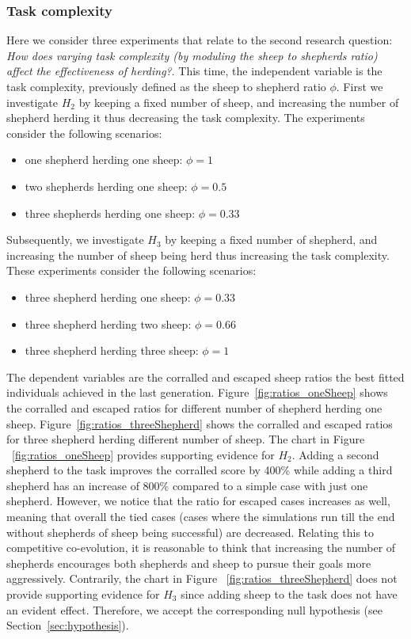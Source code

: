 \documentclass[conference]{IEEEtran}
\begin{document}
\subsubsection{Task complexity}
Here we consider three experiments that relate to the second research question: \textit{How does varying task complexity (by moduling the sheep to shepherds ratio) affect the effectiveness of herding?}. 
This time, the independent variable is the task complexity, previously defined as the sheep to shepherd ratio $\phi$.
 First we investigate $H_2$ by keeping a fixed number of sheep, and increasing the number of shepherd herding it thus decreasing the task complexity. 
 The experiments consider the following scenarios:
\begin{itemize}
	\item one shepherd herding one sheep: $\phi = 1$
	\item two shepherds herding one sheep: $\phi = 0.5$
	\item three shepherds herding one sheep: $\phi = 0.33$
\end{itemize}	
Subsequently, we investigate $H_3$ by keeping a fixed number of shepherd, and increasing the number of sheep being herd thus increasing the task complexity. These experiments consider the following scenarios:
\begin{itemize}
	\item three shepherd herding one sheep: $\phi = 0.33$
	\item three shepherd herding two sheep: $\phi = 0.66$
	\item three shepherd herding three sheep: $\phi = 1$
\end{itemize}
The dependent variables are the corralled and escaped sheep ratios the best fitted individuals achieved in the last generation.
Figure~\ref{fig:ratios_oneSheep} shows the corralled and escaped ratios for different number of shepherd herding one sheep. Figure~\ref{fig:ratios_threeShepherd} shows the corralled and escaped ratios for three shepherd herding different number of sheep. 
The chart in Figure ~\ref{fig:ratios_oneSheep} provides supporting evidence for $H_2$. Adding a second shepherd to the task improves the corralled score by 400\% while adding a third shepherd has an increase of 800\% compared to a simple case with just one shepherd. 
However, we notice that the ratio for escaped cases increases as well, meaning that overall the tied cases (cases where the simulations run till the end without shepherds of sheep being successful) are decreased. 
Relating this to competitive co-evolution, it is reasonable to think that increasing the number of shepherds encourages both shepherds and sheep to pursue their goals more aggressively.
Contrarily, the chart in Figure ~\ref{fig:ratios_threeShepherd} does not provide supporting evidence for $H_3$ since adding sheep to the task does not have an evident effect. Therefore, we accept the corresponding null hypothesis (see Section~\ref{sec:hypothesis}). 
\end{document}

